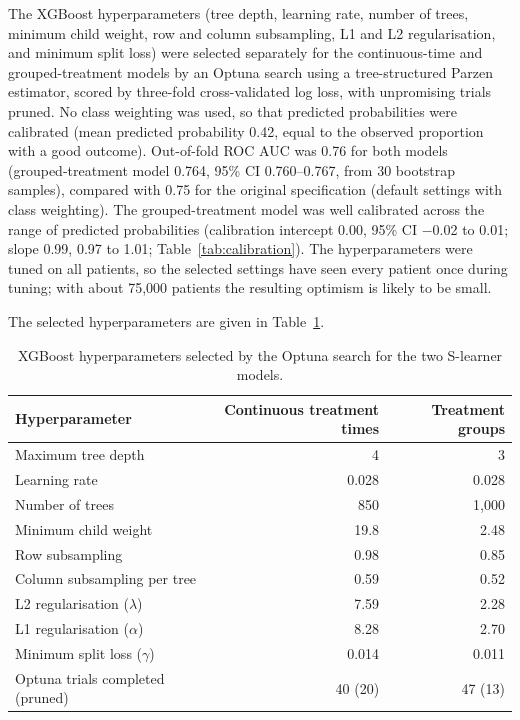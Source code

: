 The XGBoost hyperparameters (tree depth, learning rate, number of trees, minimum child weight, row and column subsampling, L1 and L2 regularisation, and minimum split loss) were selected separately for the continuous-time and grouped-treatment models by an Optuna search  using a tree-structured Parzen estimator, scored by three-fold cross-validated log loss, with unpromising trials pruned. No class weighting was used, so that predicted probabilities were calibrated (mean predicted probability 0.42, equal to the observed proportion with a good outcome). Out-of-fold ROC AUC was 0.76 for both models (grouped-treatment model 0.764, 95\% CI 0.760--0.767, from 30 bootstrap samples), compared with 0.75 for the original specification (default settings with class weighting). The grouped-treatment model was well calibrated across the range of predicted probabilities (calibration intercept 0.00, 95\% CI $-$0.02 to 0.01; slope 0.99, 0.97 to 1.01; Table~\ref{tab:calibration}). The hyperparameters were tuned on all patients, so the selected settings have seen every patient once during tuning; with about 75,000 patients the resulting optimism is likely to be small.

The selected hyperparameters are given in Table~\ref{tab:sl_hyperparams}.

\begin{table}[htbp]
\centering
\footnotesize
\caption{XGBoost hyperparameters selected by the Optuna search for the two S-learner models.}
\label{tab:sl_hyperparams}
\begin{tabular}{@{}lrr@{}}
\toprule
Hyperparameter & Continuous treatment times & Treatment groups \\
\midrule
Maximum tree depth & 4 & 3 \\
Learning rate & 0.028 & 0.028 \\
Number of trees & 850 & 1,000 \\
Minimum child weight & 19.8 & 2.48 \\
Row subsampling & 0.98 & 0.85 \\
Column subsampling per tree & 0.59 & 0.52 \\
L2 regularisation ($\lambda$) & 7.59 & 2.28 \\
L1 regularisation ($\alpha$) & 8.28 & 2.70 \\
Minimum split loss ($\gamma$) & 0.014 & 0.011 \\
\addlinespace
Optuna trials completed (pruned) & 40 (20) & 47 (13) \\
\bottomrule
\end{tabular}
\end{table}

